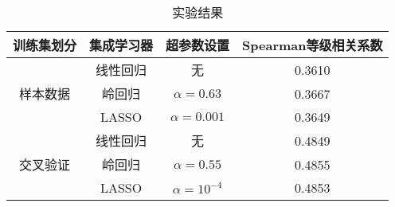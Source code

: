 \begin{table}[h]
	\caption{实验结果}
	\label{t:ensemble result}
	\vspace{0.5em}\centering\wuhao
	\begin{tabular}{cccc}
		\toprule[1.5pt]
		训练集划分 & 集成学习器 & 超参数设置 & Spearman等级相关系数 \\
		\midrule[1pt]
		\multirow{3}{*}{样本数据} & 线性回归 & 无 & 0.3610 \\
		& 岭回归 & $\alpha = 0.63$ & 0.3667 \\
		& LASSO & $\alpha = 0.001$ & 0.3649 \\
		\hline
		\multirow{3}{*}{交叉验证} & 线性回归 & 无 & 0.4849 \\
		& 岭回归 & $\alpha = 0.55$ & 0.4855 \\
		& LASSO & $\alpha = 10^{-4}$ & 0.4853 \\
		\bottomrule[1.5pt]
	\end{tabular}
\end{table}